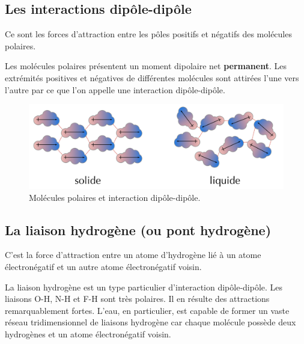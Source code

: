 \documentclass[
  11pt,
  a4paper,
  openany]{book}
\begin{document}
\subsection{Les interactions dipôle-dipôle}\label{les-interactions-dipuxf4le-dipuxf4le}

Ce sont les forces d'attraction entre les pôles positifs et négatifs des molécules polaires.

Les molécules polaires présentent un moment dipolaire net \textbf{permanent}. Les extrémités positives et négatives de différentes molécules sont attirées l'une vers l'autre par ce que l'on appelle une interaction dipôle-dipôle.

\begin{figure}

{\centering \includegraphics[width=0.67\linewidth]{images/dipole-dipole} 

}

\caption{Molécules polaires et interaction dipôle-dipôle.}\label{fig:dipole-dipole}
\end{figure}

\subsection{La liaison hydrogène (ou pont hydrogène)}\label{la-liaison-hydroguxe8ne-ou-pont-hydroguxe8ne}

C'est la force d'attraction entre un atome d'hydrogène lié à un atome électronégatif et un autre atome électronégatif voisin.

La liaison hydrogène est un type particulier d'interaction dipôle-dipôle. Les liaisons O-H, N-H et F-H sont très polaires. Il en résulte des attractions remarquablement fortes. L'eau, en particulier, est capable de former un vaste réseau tridimensionnel de liaisons hydrogène car chaque molécule possède deux hydrogènes et un atome électronégatif voisin.

\newpage
\end{document}
